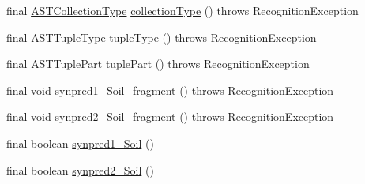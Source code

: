 \begin{DoxyCompactItemize}
\item 
final \hyperlink{classorg_1_1tzi_1_1use_1_1parser_1_1ocl_1_1_a_s_t_collection_type}{A\-S\-T\-Collection\-Type} \hyperlink{classorg_1_1tzi_1_1use_1_1parser_1_1soil_1_1_soil_parser_a0f37a8753a2f164b3b0c3f12a7dcb8dc}{collection\-Type} ()  throws Recognition\-Exception 
\item 
final \hyperlink{classorg_1_1tzi_1_1use_1_1parser_1_1ocl_1_1_a_s_t_tuple_type}{A\-S\-T\-Tuple\-Type} \hyperlink{classorg_1_1tzi_1_1use_1_1parser_1_1soil_1_1_soil_parser_ab9fba8795db38f33289c85580aec1c4e}{tuple\-Type} ()  throws Recognition\-Exception 
\item 
final \hyperlink{classorg_1_1tzi_1_1use_1_1parser_1_1ocl_1_1_a_s_t_tuple_part}{A\-S\-T\-Tuple\-Part} \hyperlink{classorg_1_1tzi_1_1use_1_1parser_1_1soil_1_1_soil_parser_a447160cf51685a8a3cb4253a11e01412}{tuple\-Part} ()  throws Recognition\-Exception 
\item 
final void \hyperlink{classorg_1_1tzi_1_1use_1_1parser_1_1soil_1_1_soil_parser_a79e05ee22adca7999be304bdf7ab902c}{synpred1\-\_\-\-Soil\-\_\-fragment} ()  throws Recognition\-Exception 
\item 
final void \hyperlink{classorg_1_1tzi_1_1use_1_1parser_1_1soil_1_1_soil_parser_a76a07bbb5da6e556f0709354609837ef}{synpred2\-\_\-\-Soil\-\_\-fragment} ()  throws Recognition\-Exception 
\item 
final boolean \hyperlink{classorg_1_1tzi_1_1use_1_1parser_1_1soil_1_1_soil_parser_ae8064811dab12265017ea67c92c54169}{synpred1\-\_\-\-Soil} ()
\item 
final boolean \hyperlink{classorg_1_1tzi_1_1use_1_1parser_1_1soil_1_1_soil_parser_aa2a078690d695b0c824dec6abe82b38c}{synpred2\-\_\-\-Soil} ()
\end{DoxyCompactItemize}
